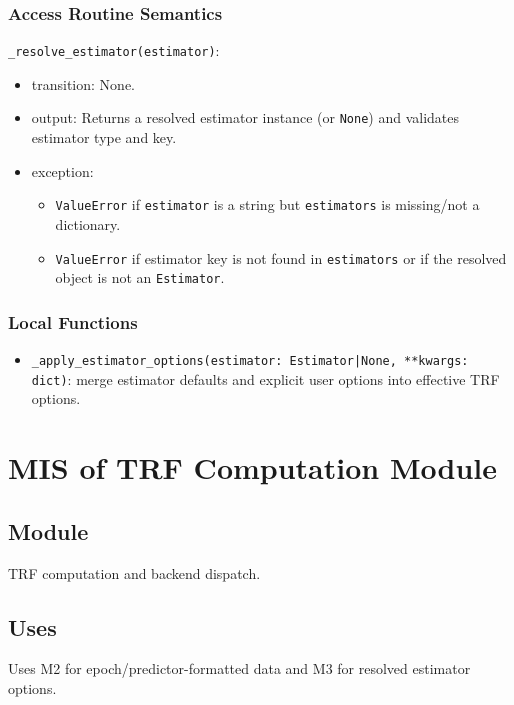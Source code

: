\documentclass[12pt, titlepage]{article}
\begin{document}
\subsubsection{Access Routine Semantics}

\noindent \texttt{\_resolve\_estimator(estimator)}:
\begin{itemize}
\item transition: None.
\item output: Returns a resolved estimator instance (or \texttt{None}) and
validates estimator type and key.
\item exception:
\begin{itemize}
\item \texttt{ValueError} if \texttt{estimator} is a string but
\texttt{estimators} is missing/not a dictionary.
\item \texttt{ValueError} if estimator key is not found in
\texttt{estimators} or if the resolved object is not an \texttt{Estimator}.
\end{itemize}
\end{itemize}

\subsubsection{Local Functions}

\begin{itemize}
\item \texttt{\_apply\_estimator\_options(estimator: Estimator|None, **kwargs: dict)}:
merge estimator defaults and explicit user options into effective TRF options.
\end{itemize}

\newpage

\section{MIS of TRF Computation Module} \label{MIS:TRF}

\subsection{Module}

TRF computation and backend dispatch.
\subsection{Uses}
Uses M2 for epoch/predictor-formatted data and M3 for resolved estimator
options.
\end{document}
